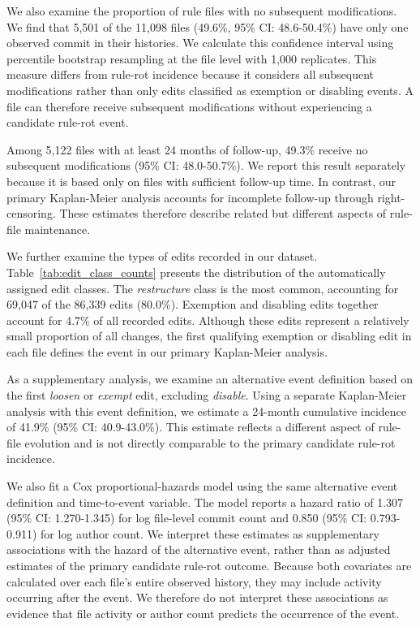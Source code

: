 We also examine the proportion of rule files with no
subsequent modifications. We find that 5,501 of the 
11,098 files (49.6\%, 95\% CI: 48.6-50.4\%) have only 
one observed commit in their histories. We calculate
this confidence interval using percentile bootstrap 
resampling at the file level with 1,000 replicates. 
This measure differs from rule-rot incidence because 
it considers all subsequent modifications rather than 
only edits classified as exemption or disabling events. 
A file can therefore receive subsequent modifications 
without experiencing a candidate rule-rot event.

Among 5,122 files with at least 24 months of follow-up,
49.3\% receive no subsequent modifications (95\% CI:
48.0-50.7\%). We report this result separately because it
is based only on files with sufficient follow-up time. In
contrast, our primary Kaplan-Meier analysis accounts for
incomplete follow-up through right-censoring. These estimates
therefore describe related but different aspects of rule-file
maintenance.

We further examine the types of edits recorded in our dataset.
Table~\ref{tab:edit_class_counts} presents the distribution
of the automatically assigned edit classes. The
\emph{restructure} class is the most common, accounting for
69,047 of the 86,339 edits (80.0\%). Exemption and disabling
edits together account for 4.7\% of all recorded edits.
Although these edits represent a relatively small proportion
of all changes, the first qualifying exemption or disabling
edit in each file defines the event in our primary
Kaplan-Meier analysis.

As a supplementary analysis, we examine an alternative event
definition based on the first \emph{loosen} or \emph{exempt}
edit, excluding \emph{disable}. Using a separate Kaplan-Meier
analysis with this event definition, we estimate a 24-month
cumulative incidence of 41.9\% (95\% CI: 40.9-43.0\%).
This estimate reflects a different aspect of rule-file
evolution and is not directly comparable to the primary
candidate rule-rot incidence.

We also fit a Cox proportional-hazards model using the same
alternative event definition and time-to-event variable.
The model reports a hazard ratio of 1.307 (95\% CI:
1.270-1.345) for log file-level commit count and 0.850
(95\% CI: 0.793-0.911) for log author count. We interpret
these estimates as supplementary associations with the
hazard of the alternative event, rather than as adjusted
estimates of the primary candidate rule-rot outcome.
Because both covariates are calculated over each file's
entire observed history, they may include activity occurring
after the event. We therefore do not interpret these
associations as evidence that file activity or author count
predicts the occurrence of the event.

